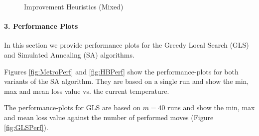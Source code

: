 \documentclass{paper}
\begin{document}
\begin{figure}[!h]
\begin{subfigure}[]{\textwidth}
    \end{subfigure}
    \caption{Improvement Heuristics (Mixed)}    
\label{fig:MixedPath}
\end{figure}

\paragraph{3. Performance Plots}
In this section we provide performance plots for the Greedy Local Search (GLS) and Simulated Annealing (SA) algorithms. 

Figures \ref{fig:MetroPerf} and \ref{fig:HBPerf} show the performance-plots for both variants of the SA algorithm. They are based on a single run and show the min, max and mean loss value vs. the current temperature.

The performance-plots for GLS are based on $m=40$ runs and show the min, max and mean loss value against the number of performed moves (Figure \ref{fig:GLSPerf}).
\end{document}

